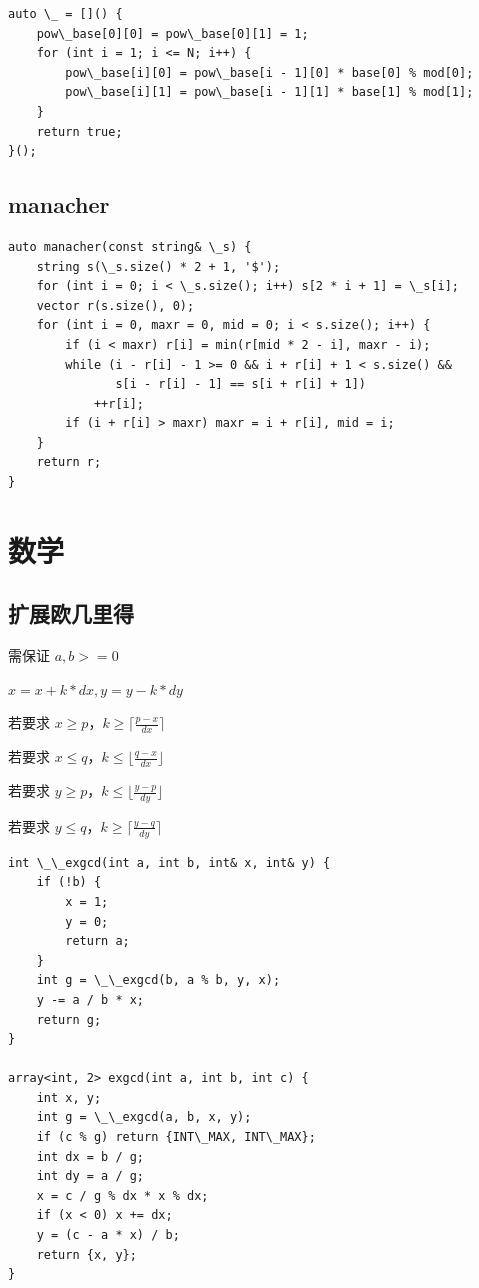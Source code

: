 \documentclass[UTF8]{ctexart}
\begin{document}
\begin{sloppypar}
\begin{lstlisting}[style=cpp]
auto \_ = []() {
    pow\_base[0][0] = pow\_base[0][1] = 1;
    for (int i = 1; i <= N; i++) {
        pow\_base[i][0] = pow\_base[i - 1][0] * base[0] % mod[0];
        pow\_base[i][1] = pow\_base[i - 1][1] * base[1] % mod[1];
    }
    return true;
}();
\end{lstlisting}

\subsection{manacher}

\begin{lstlisting}[style=cpp]
auto manacher(const string& \_s) {
    string s(\_s.size() * 2 + 1, '$');
    for (int i = 0; i < \_s.size(); i++) s[2 * i + 1] = \_s[i];
    vector r(s.size(), 0);
    for (int i = 0, maxr = 0, mid = 0; i < s.size(); i++) {
        if (i < maxr) r[i] = min(r[mid * 2 - i], maxr - i);
        while (i - r[i] - 1 >= 0 && i + r[i] + 1 < s.size() &&
               s[i - r[i] - 1] == s[i + r[i] + 1])
            ++r[i];
        if (i + r[i] > maxr) maxr = i + r[i], mid = i;
    }
    return r;
}
\end{lstlisting}

\clearpage

\section{数学}

\subsection{扩展欧几里得}

需保证 $a,b>=0$

$x=x+k*dx,y=y-k*dy$

若要求 $x\ge p$，$k\ge\lceil \frac{p-x}{dx}\rceil$

若要求 $x\le q$，$k\le\lfloor \frac{q-x}{dx}\rfloor$

若要求 $y\ge p$，$k\le\lfloor \frac{y-p}{dy}\rfloor$

若要求 $y\le q$，$k\ge\lceil \frac{y-q}{dy}\rceil$

\begin{lstlisting}[style=cpp]
int \_\_exgcd(int a, int b, int& x, int& y) {
    if (!b) {
        x = 1;
        y = 0;
        return a;
    }
    int g = \_\_exgcd(b, a % b, y, x);
    y -= a / b * x;
    return g;
}

array<int, 2> exgcd(int a, int b, int c) {
    int x, y;
    int g = \_\_exgcd(a, b, x, y);
    if (c % g) return {INT\_MAX, INT\_MAX};
    int dx = b / g;
    int dy = a / g;
    x = c / g % dx * x % dx;
    if (x < 0) x += dx;
    y = (c - a * x) / b;
    return {x, y};
}
\end{lstlisting}


\end{sloppypar}
\end{document}
